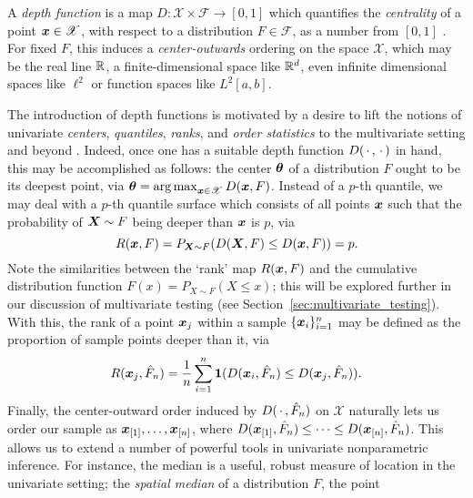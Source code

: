 

A \emph{depth function} is a map $D\colon \mathscr{X} \times \mathscr{F} \to
[0, 1]$ which quantifies the \emph{centrality} of a point $\bm{x} \in
\mathscr{X}$, with respect to a distribution $F \in \mathscr{F}$, as a number
from $[0, 1]$ \parencite{zuo-serfling-2000, mosler-mozharovskyi-2022,
liu-parelius-singh-1999, gijbels-nagy-2017}.
For fixed $F$, this induces a \emph{center-outwards} ordering on the space
$\mathscr{X}$, which may be the real line $\mathbb{R}$, a finite-dimensional space
like $\mathbb{R}^d$, even infinite dimensional spaces like $\ell^2$ or function spaces
like $L^2[a, b]$.


The introduction of depth functions is motivated by a desire to lift the
notions of univariate \emph{centers}, \emph{quantiles}, \emph{ranks}, and
\emph{order statistics} to the multivariate setting and beyond
\parencite{zuo-serfling-2000, mosler-mozharovskyi-2022}.
Indeed, once one has a suitable depth function $D(\,\cdot\,, \,\cdot\,)$ in hand, this
may be accomplished as follows: the center $\bm{\theta}$ of a distribution $F$ ought
to be its deepest point, via $\bm{\theta} = \operatorname*{arg\,max}_{\bm{x} \in \mathscr{X}} D(\bm{x}, F)$.
Instead of a $p$-th quantile, we may deal with a $p$-th quantile surface which
consists of all points $\bm{x}$ such that the probability of $\bm{X} \sim F$ being
deeper than $\bm{x}$ is $p$, via
\begin{equation}
    R(\bm{x}, F) = P_{\bm{X} \sim F}(D(\bm{X}, F) \leq D(\bm{x}, F)) = p.
\end{equation}
Note the similarities between the `rank' map $R(\bm{x}, F)$ and the cumulative
distribution function $F(x) = P_{X \sim F}(X \leq x)$; this will be explored
further in our discussion of multivariate testing (see
Section~\ref{sec:multivariate_testing}).
With this, the rank of a point $\bm{x}_j$ within a sample $\{\bm{x}_i\}_{i = 1}^n$
may be defined as the proportion of sample points deeper than it, via
\begin{equation}
    R(\bm{x}_j, \hat{F}_n) = \frac{1}{n}\sum_{i = 1}^n \bm{1}(D(\bm{x}_i, \hat{F}_n) \leq D(\bm{x}_j, \hat{F}_n)).
\end{equation}
Finally, the center-outward order induced by $D(\,\cdot\,, \hat{F}_n)$ on
$\mathscr{X}$ naturally lets us order our sample as $\bm{x}_{[1]}, \dots,
\bm{x}_{[n]}$, where $D(\bm{x}_{[1]}, \hat{F}_n) \leq \dots \leq D(\bm{x}_{[n]},
\hat{F}_n)$.
This allows us to extend a number of powerful tools in univariate
nonparametric inference.
For instance, the median is a useful, robust measure of location in the
univariate setting; the \emph{spatial median} of a distribution $F$, the point
